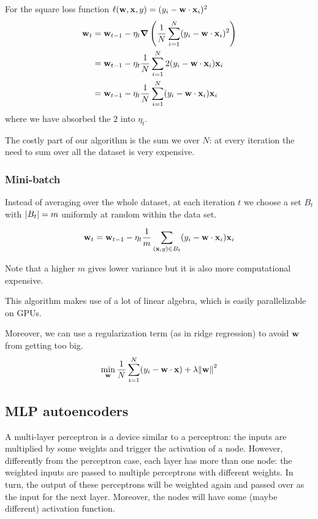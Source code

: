\documentclass[12pt]{extarticle}
\renewcommand{\vec}[1]{\bvec{#1}}
\begin{document}
For the square loss function $\ell(\vec w, \vec x, y) = (y_i - \vec w \cdot \vec x_i)^2$
\begin{align}
	\vec w_{t} & = \vec w_{t-1} - \eta_t \grad \left(\frac{1}{N}\sum_{i = 1}^N (y_i - \vec w \cdot \vec x_i)^2 \right) \\
	           & = \vec w_{t-1} - \eta_t  \frac{1}{N}\sum_{i = 1}^N 2 (y_i - \vec w \cdot \vec x_i) \vec x_i           \\
	           & = \vec w_{t-1} - \eta_t  \frac{1}{N}\sum_{i = 1}^N (y_i - \vec w \cdot \vec x_i) \vec x_i
\end{align}
where we have absorbed the $2$ into $\eta_t$.

The costly part of our algorithm is the sum we over $N$: at every iteration the need to sum over all
the dataset is very expensive.

\subsubsection{Mini-batch}
\label{sec:mini-batch}

Instead of averaging over the whole dataset, at each iteration $t$ we choose a set $B_t$ with
$\abs{B_t} = m$ uniformly at random within the data set.

\begin{equation}
	\vec w_{t} = \vec w_{t-1} - \eta_t  \frac{1}{m}\sum_{(\vec x, y) \in B_t}
	(y_i - \vec w \cdot \vec x_i) \vec x_i
\end{equation}

Note that a higher $m$ gives lower variance but it is also more computational expensive.

This algorithm makes use of a lot of linear algebra, which is easily parallelizable on GPUs.

Moreover, we can use a regularization term (as in ridge regression) to avoid $\vec w$ from getting
too big.
\begin{equation}
	\min_{\vec w} \frac{1}{N} \sum_{i = 1}^N (y_i - \vec w \cdot \vec x) + \lambda \norm{\vec w}^2
\end{equation}

\subsection{MLP autoencoders}

A multi-layer perceptron is a device similar to a perceptron: the inputs are multiplied by some
weights and trigger the activation of a node. However, differently from the perceptron case, each
layer has more than one node: the weighted inputs are passed to multiple perceptrons with different
weights. In turn, the output of these perceptrons will be weighted again and passed over as the
input for the next layer.
Moreover, the nodes will have some (maybe different) activation function.
\end{document}
